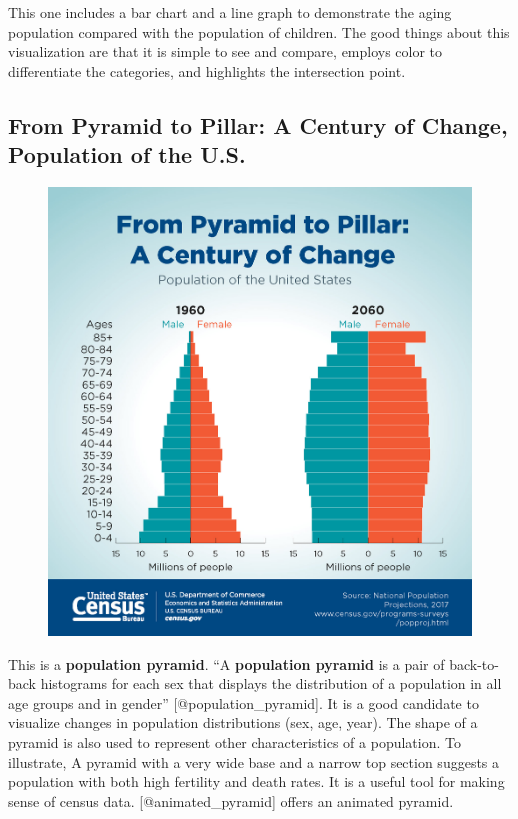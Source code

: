 \documentclass[]{book}
\theoremstyle{definition}
\theoremstyle{definition}
\theoremstyle{definition}
\theoremstyle{remark}
\begin{document}
This one includes a bar chart and a line graph to demonstrate the aging
population compared with the population of children. The good things
about this visualization are that it is simple to see and compare,
employs color to differentiate the categories, and highlights the
intersection point.

\subsection{From Pyramid to Pillar: A Century of Change, Population of
the
U.S.}\label{from-pyramid-to-pillar-a-century-of-change-population-of-the-u.s.}

\begin{figure}
\centering
\includegraphics{images/Pyramid.jpg}
\caption{}
\end{figure}

This is a \textbf{population pyramid}. ``A \textbf{population pyramid}
is a pair of back-to-back histograms for each sex that displays the
distribution of a population in all age groups and in gender''
{[}@population\_pyramid{]}. It is a good candidate to visualize changes
in population distributions (sex, age, year). The shape of a pyramid is
also used to represent other characteristics of a population. To
illustrate, A pyramid with a very wide base and a narrow top section
suggests a population with both high fertility and death rates. It is a
useful tool for making sense of census data. {[}@animated\_pyramid{]}
offers an animated pyramid.
\end{document}
